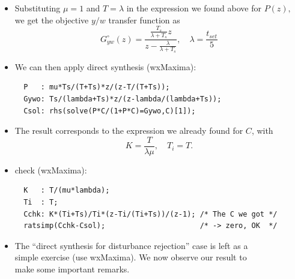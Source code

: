 \begin{frame}[fragile]
\myPause
 \begin{itemize}[<+-| alert@+>]
 \item Substituting $\mu=1$ and $T=\lambda$ in the expression we found above for $P(z),$\\
       we get the objective $y/w$ transfer function as
       \begin{displaymath}
        G_{yw}^{\circ}(z) = \frac{\frac{T_s}{\lambda+T_s} z}{z-\frac{\lambda}{\lambda+T_s}}, \quad
        \lambda           = \frac{t_{set}}{5}
       \end{displaymath}
 \item We can then apply direct synthesis (wxMaxima):
       \begin{verbatim}
  P   : mu*Ts/(T+Ts)*z/(z-T/(T+Ts));
  Gywo: Ts/(lambda+Ts)*z/(z-lambda/(lambda+Ts));
  Csol: rhs(solve(P*C/(1+P*C)=Gywo,C)[1]);
       \end{verbatim}
 \end{itemize}
\end{frame}

\begin{frame}[fragile,label={pag:PItuning-lambda}]
\myPause
 \begin{itemize}[<+-| alert@+>]
 \item The result corresponds to the expression we already found for $C$, with
       \begin{displaymath}
        K   = \frac{T}{\lambda\mu}, \quad
        T_i = T.
       \end{displaymath}
 \item check (wxMaxima):
       {\small
       \begin{verbatim}
  K   : T/(mu*lambda);
  Ti  : T;
  Cchk: K*(Ti+Ts)/Ti*(z-Ti/(Ti+Ts))/(z-1); /* The C we got */
  ratsimp(Cchk-Csol);                      /* -> zero, OK  */
       \end{verbatim}
       }
 \item The ``direct synthesis for disturbance rejection'' case is left as a\\
       simple exercise (use wxMaxima). We now observe our result to\\
       make some important remarks.
 \end{itemize}
\end{frame}

